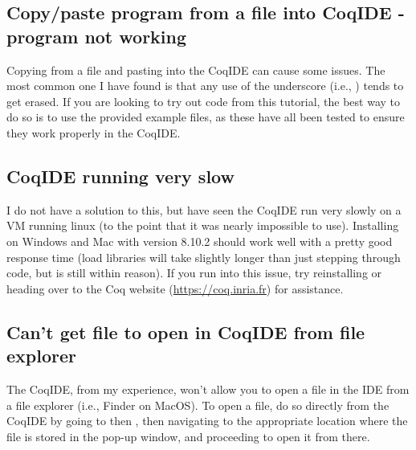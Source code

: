 \subsection{Copy/paste program from a file into CoqIDE - program not working}

Copying from a file and pasting into the CoqIDE can cause some issues. 
The most common one I have found is that any use of the underscore (i.e., \TT{\_}) tends to get erased. 
If you are looking to try out code from this tutorial, the best way to do so is to use the provided example files, 
as these have all been tested to ensure they work properly in the CoqIDE.  




\subsection{CoqIDE running very slow}

I do not have a solution to this, but have seen the CoqIDE run very slowly on a VM running linux 
(to the point that it was nearly impossible to use). 
Installing on Windows and Mac with version 8.10.2 should work well with a pretty good response time 
(load libraries will take slightly longer than just stepping through code, but is still within reason). 
If you run into this issue, try reinstalling or heading over to the Coq website (\url{https://coq.inria.fr}) 
for assistance.  


\subsection{Can't get file to open in CoqIDE from file explorer}

The CoqIDE, from my experience, won't allow you to open a file in the IDE from a file explorer (i.e., Finder on MacOS). 
To open a file, do so directly from the CoqIDE by going to  then , then navigating to the appropriate 
location where the file is stored in the pop-up window, and proceeding to open it from there. 






